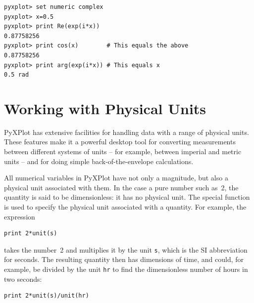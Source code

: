 \begin{verbatim}
pyxplot> set numeric complex
pyxplot> x=0.5
pyxplot> print Re(exp(i*x))
0.87758256
pyxplot> print cos(x)        # This equals the above
0.87758256
pyxplot> print arg(exp(i*x)) # This equals x
0.5 rad
\end{verbatim}

\section{Working with Physical Units}
\label{sec:units}

PyXPlot has extensive facilities for handling data with a range of physical
units. These features make it a powerful desktop tool for converting
measurements between different systems of units -- for example, between
imperial and metric units -- and for doing simple back-of-the-envelope
calculations.

All numerical variables in PyXPlot have not only a magnitude, but also a
physical unit associated with them. In the case a pure number such as~2, the
quantity is said to be dimensionless: it has no physical unit. The special
function  is used to specify the physical unit associated with a
quantity. For example, the expression

\begin{verbatim}
print 2*unit(s)
\end{verbatim}

\noindent takes the number~2 and multiplies it by the unit {\tt s}, which is
the SI abbreviation for seconds.  The resulting quantity then has dimensions of
time, and could, for example, be divided by the unit {\tt hr} to find the
dimensionless number of hours in two seconds:

\begin{verbatim}
print 2*unit(s)/unit(hr)
\end{verbatim}

